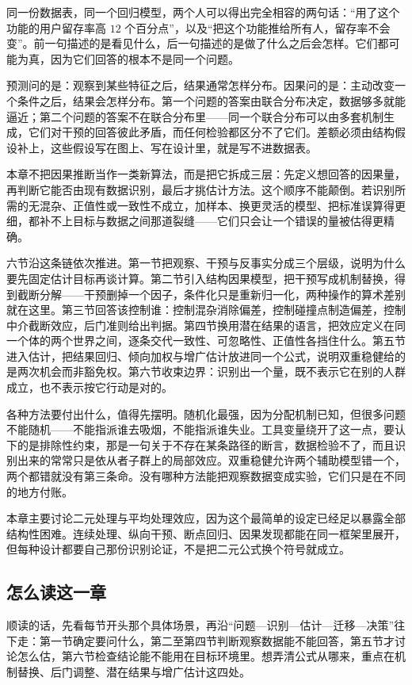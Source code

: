 同一份数据表，同一个回归模型，两个人可以得出完全相容的两句话：``用了这个功能的用户留存率高 \(12\) 个百分点''，以及``把这个功能推给所有人，留存率不会变''。前一句描述的是看见什么，后一句描述的是做了什么之后会怎样。它们都可能为真，因为它们回答的根本不是同一个问题。

预测问的是：观察到某些特征之后，结果通常怎样分布。因果问的是：主动改变一个条件之后，结果会怎样分布。第一个问题的答案由联合分布决定，数据够多就能逼近；第二个问题的答案不在联合分布里——同一个联合分布可以由多套机制生成，它们对干预的回答彼此矛盾，而任何检验都区分不了它们。差额必须由结构假设补上，这些假设写在图上、写在设计里，就是写不进数据表。

本章不把因果推断当作一类新算法，而是把它拆成三层：先定义想回答的因果量，再判断它能否由现有数据识别，最后才挑估计方法。这个顺序不能颠倒。若识别所需的无混杂、正值性或一致性不成立，加样本、换更灵活的模型、把标准误算得更细，都补不上目标与数据之间那道裂缝——它们只会让一个错误的量被估得更精确。

六节沿这条链依次推进。第一节把观察、干预与反事实分成三个层级，说明为什么要先固定估计目标再谈计算。第二节引入结构因果模型，把干预写成机制替换，得到截断分解——干预删掉一个因子，条件化只是重新归一化，两种操作的算术差别就在这里。第三节回答该控制谁：控制混杂消除偏差，控制碰撞点制造偏差，控制中介截断效应，后门准则给出判据。第四节换用潜在结果的语言，把效应定义在同一个体的两个世界之间，逐条交代一致性、可忽略性、正值性各挡住什么。第五节进入估计，把结果回归、倾向加权与增广估计放进同一个公式，说明双重稳健给的是两次机会而非豁免权。第六节收束边界：识别出一个量，既不表示它在别的人群成立，也不表示按它行动是对的。

各种方法要付出什么，值得先摆明。随机化最强，因为分配机制已知，但很多问题不能随机——不能指派谁去吸烟，不能指派谁失业。工具变量绕开了这一点，要认下的是排除性约束，那是一句关于不存在某条路径的断言，数据检验不了，而且识别出来的常常只是依从者子群上的局部效应。双重稳健允许两个辅助模型错一个，两个都错就没有第三条命。没有哪种方法能把观察数据变成实验，它们只是在不同的地方付账。

本章主要讨论二元处理与平均处理效应，因为这个最简单的设定已经足以暴露全部结构性困难。连续处理、纵向干预、断点回归、因果发现都能在同一框架里展开，但每种设计都要自己那份识别论证，不是把二元公式换个符号就成立。

\subsection{怎么读这一章}

顺读的话，先看每节开头那个具体场景，再沿``问题—识别—估计—迁移—决策''往下走：第一节确定要问什么，第二至第四节判断观察数据能不能回答，第五节才讨论怎么估，第六节检查结论能不能用在目标环境里。想弄清公式从哪来，重点在机制替换、后门调整、潜在结果与增广估计这四处。

